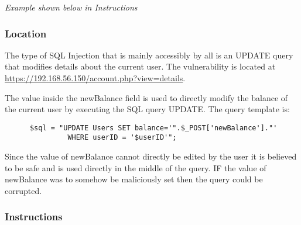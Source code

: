 \documentclass[titlepage]{article}
\begin{document}
      \textit{Example shown below in Instructions}


      \subsubsection{Location} %
      \label{ssub:sql_injection_location}
      
      The type of SQL Injection that is mainly accessibly by all is an UPDATE query that modifies details about the current user. The vulnerability is located at \url{https://192.168.56.150/account.php?view=details}. 

      The value inside the newBalance field is used to directly modify the balance of the current user by executing the SQL query UPDATE. The query template is: 

      \begin{lstlisting}
      $sql = "UPDATE Users SET balance='".$_POST['newBalance']."'
               WHERE userID = '$userID'";
      \end{lstlisting}

      Since the value of newBalance cannot directly be edited by the user it is believed to be safe and is used directly in the middle of the query. IF the value of newBalance was to somehow be maliciously set then the query could be corrupted.


      \subsubsection{Instructions} %
      \label{ssub:sql_injection_instructions}
      
\end{document}
